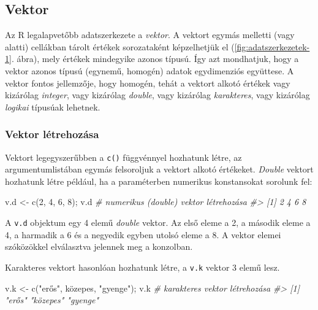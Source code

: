 \documentclass[
]{book}
\newenvironment{Shaded}{\begin{snugshade}}{\end{snugshade}}
\newcommand{\CommentTok}[1]{\textcolor[rgb]{0.56,0.35,0.01}{\textit{#1}}}
\newcommand{\DecValTok}[1]{\textcolor[rgb]{0.00,0.00,0.81}{#1}}
\newcommand{\FunctionTok}[1]{\textcolor[rgb]{0.00,0.00,0.00}{#1}}
\newcommand{\NormalTok}[1]{#1}
\newcommand{\OtherTok}[1]{\textcolor[rgb]{0.56,0.35,0.01}{#1}}
\newcommand{\StringTok}[1]{\textcolor[rgb]{0.31,0.60,0.02}{#1}}
\begin{document}
\hypertarget{vektor}{%
\subsection{Vektor}\label{vektor}}

Az R legalapvetőbb adatszerkezete a \emph{vektor}. A vektort egymás melletti (vagy alatti) cellákban tárolt értékek sorozataként képzelhetjük el (\ref{fig:adatszerkezetek-1}. ábra), mely értékek mindegyike azonos típusú. Így azt mondhatjuk, hogy a vektor azonos típusú (egynemű, homogén) adatok egydimenziós együttese. A vektor fontos jellemzője, hogy homogén, tehát a vektort alkotó értékek vagy kizárólag \emph{integer}, vagy kizárólag \emph{double}, vagy kizárólag \emph{karakteres}, vagy kizárólag \emph{logikai} típusúak lehetnek.

\hypertarget{vektor-luxe9trehozuxe1sa}{%
\subsubsection{Vektor létrehozása}\label{vektor-luxe9trehozuxe1sa}}

Vektort legegyszerűbben a \texttt{c()} függvénnyel hozhatunk létre, az argumentumlistában egymás felsoroljuk a vektort alkotó értékeket. \emph{Double} vektort hozhatunk létre például, ha a paraméterben numerikus konstansokat sorolunk fel:

\begin{Shaded}
\begin{Highlighting}[]
\NormalTok{v.d }\OtherTok{\textless{}{-}} \FunctionTok{c}\NormalTok{(}\DecValTok{2}\NormalTok{, }\DecValTok{4}\NormalTok{, }\DecValTok{6}\NormalTok{, }\DecValTok{8}\NormalTok{); v.d  }\CommentTok{\# numerikus (double) vektor létrehozása}
\CommentTok{\#\textgreater{} [1] 2 4 6 8}
\end{Highlighting}
\end{Shaded}

A \texttt{v.d} objektum egy 4 elemű \emph{double} vektor. Az első eleme a 2, a második eleme a 4, a harmadik a 6 és a negyedik egyben utolsó eleme a 8. A vektor elemei szóközökkel elválasztva jelennek meg a konzolban.

Karakteres vektort hasonlóan hozhatunk létre, a \texttt{v.k} vektor 3 elemű lesz.

\begin{Shaded}
\begin{Highlighting}[]
\NormalTok{v.k }\OtherTok{\textless{}{-}} \FunctionTok{c}\NormalTok{(}\StringTok{"erős"}\NormalTok{, }\StringTok{\textquotesingle{}közepes\textquotesingle{}}\NormalTok{, }\StringTok{"gyenge"}\NormalTok{); v.k }\CommentTok{\# karakteres vektor létrehozása}
\CommentTok{\#\textgreater{} [1] "erős"    "közepes" "gyenge"}
\end{Highlighting}
\end{Shaded}
\end{document}
